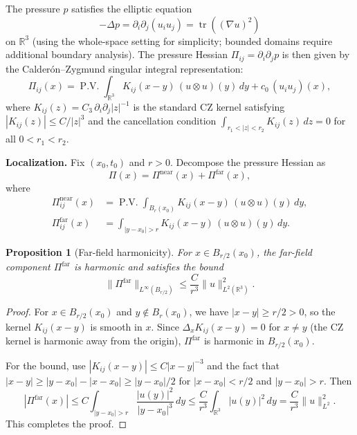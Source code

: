 \documentclass[11pt]{article}
\newtheorem{proposition}[theorem]{Proposition}
\theoremstyle{definition}
\theoremstyle{remark}
\DeclareMathOperator{\tr}{tr}
\DeclareMathOperator{\PV}{P.V.}
\newcommand{\R}{\mathbb{R}}
\begin{document}
The pressure $p$ satisfies the elliptic equation
\begin{equation}\label{eq:pressure-elliptic}
  -\Delta p = \partial_i\partial_j(u_i u_j) = \tr((\nabla u)^2)
\end{equation}
on $\R^3$ (using the whole-space setting for simplicity; bounded domains require
additional boundary analysis).  The pressure Hessian $\Pi_{ij} = \partial_i\partial_j p$
is then given by the Calder\'on--Zygmund singular integral representation:
\begin{equation}\label{eq:CZ-rep}
  \Pi_{ij}(x) = \PV\int_{\R^3} K_{ij}(x-y)\,(u\otimes u)(y)\, dy
  + c_0\,(u_i u_j)(x),
\end{equation}
where $K_{ij}(z) = C_3\,\partial_i\partial_j|z|^{-1}$ is the standard CZ kernel
satisfying $|K_{ij}(z)| \leq C/|z|^3$ and the cancellation condition
$\int_{r_1 < |z| < r_2} K_{ij}(z)\, dz = 0$ for all $0 < r_1 < r_2$.

\medskip
\noindent\textbf{Localization.}  Fix $(x_0, t_0)$ and $r > 0$.  Decompose the
pressure Hessian as
\begin{equation}\label{eq:Pi-decomp}
  \Pi(x) = \Pi^{\mathrm{near}}(x) + \Pi^{\mathrm{far}}(x),
\end{equation}
where
\begin{align}
  \Pi^{\mathrm{near}}_{ij}(x) &= \PV\int_{B_r(x_0)}
    K_{ij}(x-y)\,(u\otimes u)(y)\, dy, \label{eq:Pi-near} \\
  \Pi^{\mathrm{far}}_{ij}(x) &= \int_{|y-x_0|>r}
    K_{ij}(x-y)\,(u\otimes u)(y)\, dy. \label{eq:Pi-far}
\end{align}

\begin{proposition}[Far-field harmonicity]
\label{prop:far-harmonic}
For $x \in B_{r/2}(x_0)$, the far-field component $\Pi^{\mathrm{far}}$ is harmonic
and satisfies the bound
\begin{equation}\label{eq:far-bound}
  \|\Pi^{\mathrm{far}}\|_{L^\infty(B_{r/2})} \leq \frac{C}{r^3}\|u\|_{L^2(\R^3)}^2.
\end{equation}
\end{proposition}

\begin{proof}
For $x \in B_{r/2}(x_0)$ and $y \notin B_r(x_0)$, we have $|x - y| \geq r/2 > 0$,
so the kernel $K_{ij}(x-y)$ is smooth in $x$.  Since $\Delta_x K_{ij}(x-y) = 0$
for $x \neq y$ (the CZ kernel is harmonic away from the origin), $\Pi^{\mathrm{far}}$
is harmonic in $B_{r/2}(x_0)$.

For the bound, use $|K_{ij}(x-y)| \leq C|x-y|^{-3}$ and the fact that
$|x-y| \geq |y-x_0| - |x-x_0| \geq |y-x_0|/2$ for $|x-x_0| < r/2$ and
$|y-x_0| > r$.  Then
\[
  |\Pi^{\mathrm{far}}(x)| \leq C\int_{|y-x_0|>r}
  \frac{|u(y)|^2}{|y-x_0|^3}\, dy
  \leq \frac{C}{r^3}\int_{\R^3} |u(y)|^2\, dy
  = \frac{C}{r^3}\|u\|_{L^2}^2.
\]
This completes the proof.
\end{proof}
\end{document}
